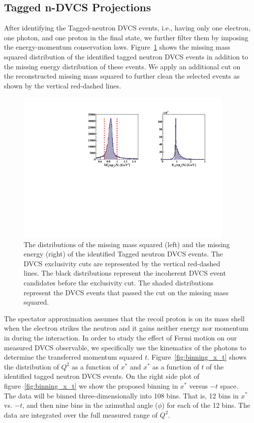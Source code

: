 \subsection{Tagged n-DVCS Projections}
After identifying the Tagged-neutron DVCS events, i.e., having only one 
electron, one photon, and one proton in the final state, we further filter them 
by imposing the energy-momentum conservation laws.  
Figure~\ref{fig:tagged_exclusive} shows the missing mass squared distribution 
of the identified tagged neutron DVCS events in addition to the missing energy 
distribution of these events. We apply an additional cut on the reconstructed 
missing mass squared to further clean the selected events as shown by the 
vertical red-dashed lines. 

\begin{figure}[htb]
  \centering
    \includegraphics[width=0.95\textwidth,clip]{figs/all_inincoh_exc_cuts.pdf}
  \caption{The distributions of the missing mass squared (left) and the missing 
   energy (right) of the identified Tagged neutron DVCS events. The DVCS 
   exclusivity cuts are represented by the vertical red-dashed lines. The black 
   distributions represent the incoherent DVCS event candidates before the 
   exclusivity cut. The shaded distributions represent the DVCS events that 
   passed the cut on the missing mass squared.
   \label{fig:tagged_exclusive}}
\end{figure}

The spectator approximation assumes that the recoil proton is on its mass shell 
when the electron strikes the neutron and it gains neither energy nor momentum 
in during the interaction. 
In order to study the effect of Fermi motion on our measured DVCS observable, 
we specifically use the kinematics of the photons to determine the transferred 
momentum squared $t$.  Figure~\ref{fig:binning_x_t} shows the distribution of 
$Q^2$ as a function of $x^*$ and $x^*$ as a function of $t$ of the identified 
tagged neutron DVCS events. On the right side plot of 
figure~\ref{fig:binning_x_t} we show the proposed binning in $x^{*}$ versus 
$-t$ space. The data will be binned three-dimensionally into 108 bins. That is, 
12 bins in $x^{*}$ vs. $-t$, and then nine bins in the azimuthal angle ($\phi$) 
for each of the 12 bins. The data are integrated over the full measured range 
of $Q^2$.   
   

